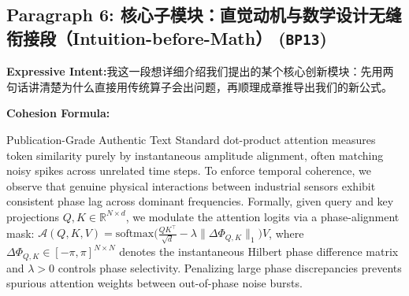 \subsection*{Paragraph 6: 核心子模块：直觉动机与数学设计无缝衔接段（Intuition-before-Math） (\texttt{BP13})}
\noindent\textbf{Expressive Intent:}\enspace 我这一段想详细介绍我们提出的某个核心创新模块：先用两句话讲清楚为什么直接用传统算子会出问题，再顺理成章推导出我们的新公式。\par
\noindent\textbf{Cohesion Formula:}\par\vspace{4pt}
\begin{ExampleBox}{Publication-Grade Authentic Text}
Standard dot-product attention measures token similarity purely by instantaneous amplitude alignment, often matching noisy spikes across unrelated time steps. To enforce temporal coherence, we observe that genuine physical interactions between industrial sensors exhibit consistent phase lag across dominant frequencies. Formally, given query and key projections $Q, K \in \mathbb{R}^{N \times d}$, we modulate the attention logits via a phase-alignment mask: $\mathcal{A}(Q, K, V) = \text{softmax}\big(\frac{QK^\top}{\sqrt{d}} - \lambda \|\Delta \Phi_{Q,K}\|_1\big)V$, where $\Delta \Phi_{Q,K} \in [-\pi, \pi]^{N \times N}$ denotes the instantaneous Hilbert phase difference matrix and $\lambda > 0$ controls phase selectivity. Penalizing large phase discrepancies prevents spurious attention weights between out-of-phase noise bursts.
\end{ExampleBox}
